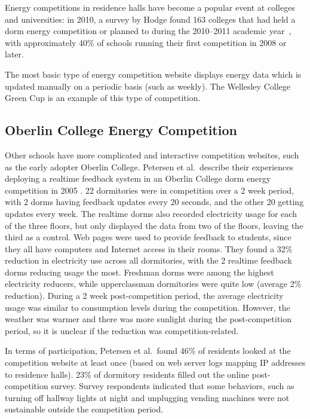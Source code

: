 Energy competitions in residence halls have become a popular event at colleges and universities: in 2010, a survey by Hodge found 163 colleges that had held a dorm energy competition or planned to during the 2010--2011 academic year~\cite{Hodge2010}, with approximately 40\% of schools running their first competition in 2008 or later.

The most basic type of energy competition website displays energy data which is updated manually on a periodic basis (such as weekly). The Wellesley College Green Cup \cite{wellesley-green-cup} is an example of this type of competition.

\subsection{Oberlin College Energy Competition}

Other schools have more complicated and interactive competition websites, such as the early adopter Oberlin College. Petersen et al.\ describe their experiences deploying a realtime feedback system in an Oberlin College dorm energy competition in 2005 \cite{petersen-dorm-energy-reduction,Petersen07a}. 22 dormitories were in competition over a 2 week period, with 2 dorms having feedback updates every 20 seconds, and the other 20 getting updates every week. The realtime dorms also recorded electricity usage for each of the three floors, but only displayed the data from two of the floors, leaving the third as a control. Web pages were used to provide feedback to students, since they all have computers and Internet access in their rooms. They found a 32\% reduction in electricity use across all dormitories, with the 2 realtime feedback dorms reducing usage the most. Freshman dorms were among the highest electricity reducers, while upperclassman dormitories were quite low (average 2\% reduction). During a 2 week post-competition period, the average electricity usage was similar to consumption levels during the competition. However, the weather was warmer and there was more sunlight during the post-competition period, so it is unclear if the reduction was competition-related.

In terms of participation, Petersen et al.\ found 46\% of residents looked at the competition website at least once (based on web server logs mapping IP addresses to residence halls). 23\% of dormitory residents filled out the online post-competition survey. Survey respondents indicated that some behaviors, such as turning off hallway lights at night and unplugging vending machines were not sustainable outside the competition period.

